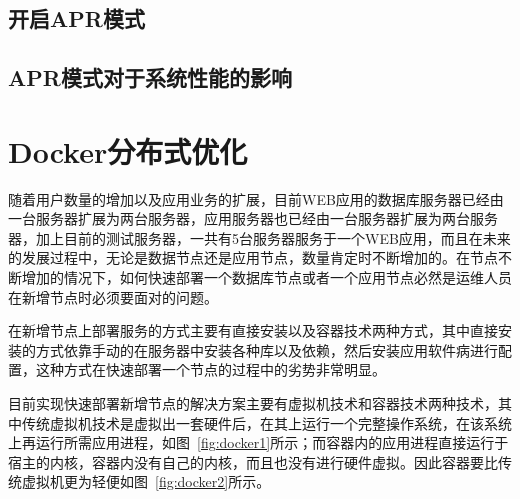 \subsection{开启APR模式}

\subsection{APR模式对于系统性能的影响}
\section{Docker分布式优化}
随着用户数量的增加以及应用业务的扩展，目前WEB应用的数据库服务器已经由一台服务器扩展为两台服务器，应用服务器也已经由一台服务器扩展为两台服务器，加上目前的测试服务器，一共有5台服务器服务于一个WEB应用，而且在未来的发展过程中，无论是数据节点还是应用节点，数量肯定时不断增加的。在节点不断增加的情况下，如何快速部署一个数据库节点或者一个应用节点必然是运维人员在新增节点时必须要面对的问题。

在新增节点上部署服务的方式主要有直接安装以及容器技术两种方式，其中直接安装的方式依靠手动的在服务器中安装各种库以及依赖，然后安装应用软件病进行配置，这种方式在快速部署一个节点的过程中的劣势非常明显。

目前实现快速部署新增节点的解决方案主要有虚拟机技术和容器技术两种技术，其中传统虚拟机技术是虚拟出一套硬件后，在其上运行一个完整操作系统，在该系统上再运行所需应用进程，如图~\ref{fig:docker1}所示；而容器内的应用进程直接运行于宿主的内核，容器内没有自己的内核，而且也没有进行硬件虚拟。因此容器要比传统虚拟机更为轻便如图~\ref{fig:docker2}所示\cite{刘熙2016基于}。


